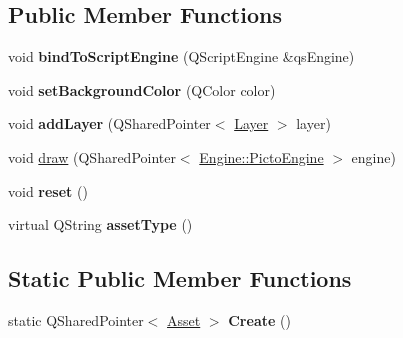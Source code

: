 \subsection*{Public Member Functions}
\begin{DoxyCompactItemize}
\item 
\hypertarget{class_picto_1_1_canvas_aad919f30f943fefb1076816fb7bde6ad}{void {\bfseries bind\-To\-Script\-Engine} (Q\-Script\-Engine \&qs\-Engine)}\label{class_picto_1_1_canvas_aad919f30f943fefb1076816fb7bde6ad}

\item 
\hypertarget{class_picto_1_1_canvas_ab6a0a9946b6fba3936380e059021892d}{void {\bfseries set\-Background\-Color} (Q\-Color color)}\label{class_picto_1_1_canvas_ab6a0a9946b6fba3936380e059021892d}

\item 
\hypertarget{class_picto_1_1_canvas_abb6c14d333c8784d88d8264a0b3af3df}{void {\bfseries add\-Layer} (Q\-Shared\-Pointer$<$ \hyperlink{class_picto_1_1_layer}{Layer} $>$ layer)}\label{class_picto_1_1_canvas_abb6c14d333c8784d88d8264a0b3af3df}

\item 
void \hyperlink{class_picto_1_1_canvas_a903f9d1480d912a8ad54ff6af9e24e0c}{draw} (Q\-Shared\-Pointer$<$ \hyperlink{class_picto_1_1_engine_1_1_picto_engine}{Engine\-::\-Picto\-Engine} $>$ engine)
\item 
\hypertarget{class_picto_1_1_canvas_adc2557db1f3601637e3d576d58379fc6}{void {\bfseries reset} ()}\label{class_picto_1_1_canvas_adc2557db1f3601637e3d576d58379fc6}

\item 
\hypertarget{class_picto_1_1_canvas_a10a516c81b72fb03293ded81619e4c49}{virtual Q\-String {\bfseries asset\-Type} ()}\label{class_picto_1_1_canvas_a10a516c81b72fb03293ded81619e4c49}

\end{DoxyCompactItemize}
\subsection*{Static Public Member Functions}
\begin{DoxyCompactItemize}
\item 
\hypertarget{class_picto_1_1_canvas_a8b225a0d18bfb73236a65b9f4e063c09}{static Q\-Shared\-Pointer$<$ \hyperlink{class_picto_1_1_asset}{Asset} $>$ {\bfseries Create} ()}\label{class_picto_1_1_canvas_a8b225a0d18bfb73236a65b9f4e063c09}

\end{DoxyCompactItemize}
